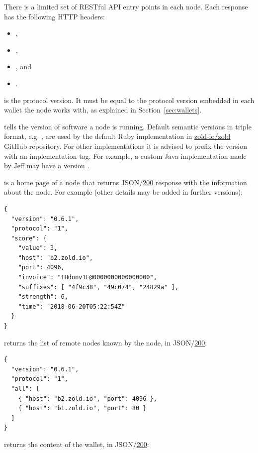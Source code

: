 \documentclass{main}
\begin{document}
There is a limited set of RESTful API entry points in each node.
Each response has the following HTTP headers:
\begin{itemize}
\item {},
\item {},
\item {}, and
\item {}.
\end{itemize}

 is the protocol version.
It must be equal to the protocol version embedded in each wallet the
node works with, as explained in Section~\ref{sec:wallets}.

 tells the version of software a node is running.
Default semantic versions in triple format, e.g. , are used
by the default Ruby implementation in
\href{https://github.com/zold-io/zold}{zold-io/zold} GitHub repository.
For other implementations it is
advised to prefix the version with an implementation tag. For example,
a custom Java implementation made by Jeff may have a version .

 is a home page of a node that returns
JSON/\href{https://www.w3.org/Protocols/rfc2616/rfc2616-sec10.html#sec10.2.1}{200}
response with the
information about the node. For example (other details may be added in
further versions):

\begin{verbatim}
{
  "version": "0.6.1",
  "protocol": "1",
  "score": {
    "value": 3,
    "host": "b2.zold.io",
    "port": 4096,
    "invoice": "THdonv1E@0000000000000000",
    "suffixes": [ "4f9c38", "49c074", "24829a" ],
    "strength": 6,
    "time": "2018-06-20T05:22:54Z"
  }
}
\end{verbatim}

 returns the list of remote nodes known by the node,
in JSON/\href{https://www.w3.org/Protocols/rfc2616/rfc2616-sec10.html#sec10.2.1}{200}:

\begin{verbatim}
{
  "version": "0.6.1",
  "protocol": "1",
  "all": [
    { "host": "b2.zold.io", "port": 4096 },
    { "host": "b1.zold.io", "port": 80 }
  ]
}\end{verbatim}

 returns the content of the wallet, in
JSON/\href{https://www.w3.org/Protocols/rfc2616/rfc2616-sec10.html#sec10.2.1}{200}:
\end{document}
